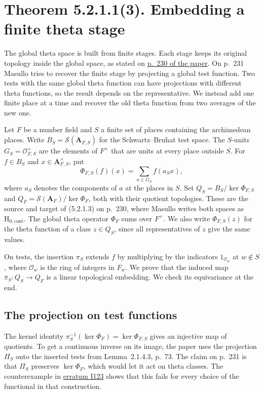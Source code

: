 \section{Theorem 5.2.1.1(3). Embedding a finite theta stage}

The global theta space is built from finite stages. Each stage keeps its
original topology inside the global space, as stated on
\href{https://github.com/mccorvie/riemann-masullo/blob/ac7e1cde68ff1fac01ecbef3c0e9f48e46bc1f06/paper/the-music-of-the-primes.pdf#page=230}{p.~230 of the paper}.
On p.~231 Masullo tries to recover the finite stage by projecting a global
test function. Two tests with the same global theta function can have
projections with different theta functions, so the result depends on the
representative. We instead add one finite place at a time and recover the
old theta function from two averages of the new one.

Let \(F\) be a number field and \(S\) a finite set of places containing the
archimedean places. Write \(B_S=\mathcal S(\mathbf A_{F,S})\) for the
Schwartz--Bruhat test space. The \(S\)-units \(G_S=\mathcal O_{F,S}^{\times}\)
are the elements of \(F^\times\) that are units at every place outside \(S\).
For \(f\in B_S\) and \(x\in\mathbf A_{F,S}^{\times}\), put
\[
  \Phi_{F,S}(f)(x)=\sum_{a\in G_S} f(a_S x),
\]
where \(a_S\) denotes the components of \(a\) at the places in \(S\).
Set \(Q_S=B_S/\ker\Phi_{F,S}\) and
\(Q_F=\mathcal S(\mathbf A_F)/\ker\Phi_F\), both with their quotient
topologies. These are the source and target of (5.2.1.3) on p.~230,
where Masullo writes both spaces as \(\mathrm H_{0,\mathrm{cont}}\).
The global theta operator \(\Phi_F\) sums over \(F^\times\).
We also write \(\Phi_{F,S}(z)\) for the theta function of a class \(z\in Q_S\),
since all representatives of \(z\) give the same values.

On tests, the insertion \(\pi_S\) extends \(f\) by multiplying by the
indicators \(1_{\mathcal O_w}\) at \(w\notin S\), where \(\mathcal O_w\) is
the ring of integers in \(F_w\). We prove that the induced map
\(\bar\pi_S\colon Q_S\to Q_F\) is a linear topological embedding.
We check its equivariance at the end.

\subsection{The projection on test functions}

The kernel identity \(\pi_S^{-1}(\ker\Phi_F)=\ker\Phi_{F,S}\) gives an
injective map of quotients. To get a continuous inverse on its image, the
paper uses the projection \(\Pi_S\) onto the inserted tests from
Lemma~2.1.4.3, p.~73. The claim on p.~231 is that \(\Pi_S\) preserves
\(\ker\Phi_F\), which would let it act on theta classes. The counterexample in
\href{https://github.com/mccorvie/riemann-masullo/blob/ac7e1cde68ff1fac01ecbef3c0e9f48e46bc1f06/ERRATA.md#L583}{erratum I123}
shows that this fails for every choice of the functional in that construction.

